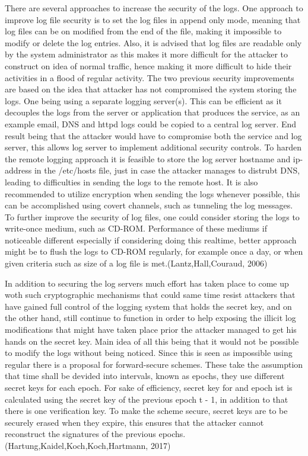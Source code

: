 \documentclass{article}
\begin{document}
There are several approaches to increase the security of the logs. One approach to improve log file security is to set the log files in append only mode, meaning that log files can be on modified from the end of the file, making it impossible to modify or delete the log entries. Also, it is advised that log files are readable only by the system administrator as this makes it more difficult for the attacker to construct on idea of normal traffic, hence making it more difficult to hide their activities in a flood of regular activity. The two previous security improvements are based on the idea that attacker has not compromised the system storing the logs.  One being using a separate logging server(s). This can be efficient as it decouples the logs from the server or application that produces the service, as an example email, DNS and httpd logs could be copied to a central log server. End result being that the attacker would have to compromise both the service and log server, this allows log server to implement additional security controls. To harden the remote logging approach it is feasible to store the log server hostname and ip-address in the /etc/hosts file, just in case the attacker manages to distrubt DNS, leading to difficulties in sending the logs to the remote host. It is also recommended to utilize encryption when sending the logs whenever possible, this can be accomplished using covert channels, such as tunneling the log messages. To further improve the security of log files, one could consider storing the logs to write-once medium, such as CD-ROM. Performance of these mediums if noticeable different especially if considering doing this realtime, better approach might be to flush the logs to CD-ROM regularly, for example once a day, or when given criteria such as size of a log file is met.(Lantz,Hall,Couraud, 2006)
\par
In addition to securing the log servers much effort has taken place to come up woth such cryptographic mechanisms that could same time resist attackers that have gained full control of the logging system that holds the secret key, and on the other hand, still continue to function in order to help exposing the illicit log modifications that might have taken place prior the attacker managed to get his hands on the secret key. Main idea of all this being that it would not be possible to modify the logs without being noticed. Since this is seen as impossible using regular there is a proposal for forward-secure schemes. These take the assumption that time shall be devided into intervals, known as epochs, they use different secret keys for each epoch. For sake of efficiency, secret key for and epoch ist is calculated using the secret key of the previous epoch t - 1, in addition to that there is one verification key. To make the scheme secure, secret keys are to be securely erased when they expire, this ensures that the attacker cannot reconstruct the signatures of the previous epochs.(Hartung,Kaidel,Koch,Koch,Hartmann, 2017)
\end{document}
